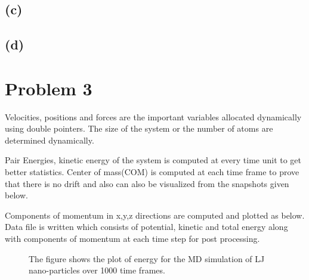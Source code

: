 \documentclass{article}
\begin{document}
\subsection{(c)}
\label{sec-2-4}
\subsection{(d)}
\label{sec-2-5}

\section{Problem 3}
\label{sec-3}
Velocities, positions and forces are the important variables allocated dynamically using double pointers. The size of the system or the number of atoms are determined dynamically.

Pair Energies, kinetic energy of the system is computed at every time unit to get better statistics. Center of mass(COM) is computed at each time frame to prove that there is no drift and also can also be visualized from the snapshots given below.

Components of momentum in x,y,z directions are computed and plotted as below. Data file is written which consists of potential, kinetic and total energy along with components of momentum at each time step for post processing.


\begin{figure}[H]
\begin{centering}
\caption{The figure shows the plot of energy for the MD simulation of LJ nano-particles over 1000 time frames.}
\label{fig:fig1}
\end{centering}
\end{figure}
\end{document}
